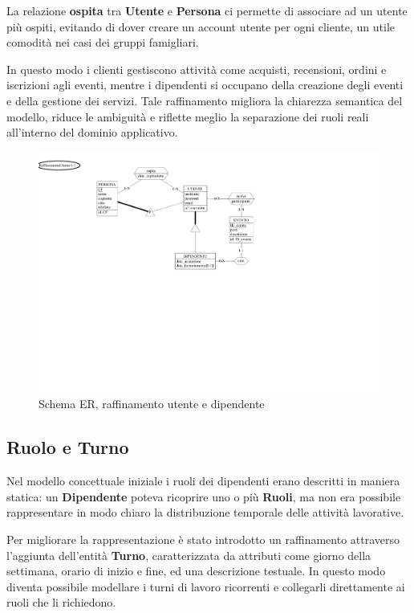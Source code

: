 \documentclass[a4paper,12pt]{report}
\begin{document}
\vspace{\baselineskip}
La relazione \textbf{ospita} tra \textbf{Utente} e \textbf{Persona} ci permette di associare ad un utente più ospiti, evitando di dover creare
un account utente per ogni cliente, un utile comodità nei casi dei gruppi famigliari.

\vspace{\baselineskip}
In questo modo i clienti gestiscono attività come acquisti, recensioni, ordini e iscrizioni agli eventi, mentre
i dipendenti si occupano della creazione degli eventi e della gestione dei servizi. Tale raffinamento migliora
la chiarezza semantica del modello, riduce le ambiguità e riflette meglio la separazione dei ruoli reali all'interno
del dominio applicativo.

\begin{figure}[H]
	\centering
	\includegraphics[width=\textwidth, trim=0 250pt 300pt 0, clip]{./pdf/raffinamento utente.pdf}
	\caption{Schema ER, raffinamento utente e dipendente}
	\label{fig:raffinamento-utente}
\end{figure}

\newpage

\subsection{Ruolo e Turno}
Nel modello concettuale iniziale i ruoli dei dipendenti erano descritti in maniera statica:
un \textbf{Dipendente} poteva ricoprire uno o più \textbf{Ruoli}, ma non era possibile rappresentare
in modo chiaro la distribuzione temporale delle attività lavorative.

\vspace{\baselineskip}
Per migliorare la rappresentazione è stato introdotto un raffinamento attraverso
l'aggiunta dell'entità \textbf{Turno}, caratterizzata da attributi come giorno della settimana,
orario di inizio e fine, ed una descrizione testuale. In questo modo diventa possibile
modellare i turni di lavoro ricorrenti e collegarli direttamente ai ruoli che li richiedono.
\end{document}
